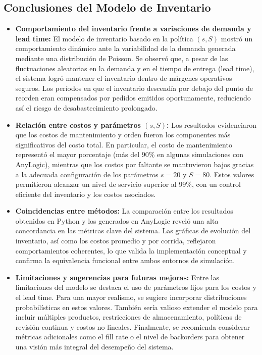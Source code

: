 \documentclass[12pt]{article}
\begin{document}
\subsection{Conclusiones del Modelo de Inventario}
\begin{itemize}
    \item \textbf{Comportamiento del inventario frente a variaciones de demanda y lead time:}  
    El modelo de inventario basado en la política $(s, S)$ mostró un comportamiento dinámico ante la variabilidad de la demanda generada mediante una distribución de Poisson. Se observó que, a pesar de las fluctuaciones aleatorias en la demanda y en el tiempo de entrega (lead time), el sistema logró mantener el inventario dentro de márgenes operativos seguros. Los períodos en que el inventario descendía por debajo del punto de reorden eran compensados por pedidos emitidos oportunamente, reduciendo así el riesgo de desabastecimiento prolongado.

    \item \textbf{Relación entre costos y parámetros $(s, S)$:}  
    Los resultados evidenciaron que los costos de mantenimiento y orden fueron los componentes más significativos del costo total. En particular, el costo de mantenimiento representó el mayor porcentaje (más del 90\% en algunas simulaciones con AnyLogic), mientras que los costos por faltante se mantuvieron bajos gracias a la adecuada configuración de los parámetros $s = 20$ y $S = 80$. Estos valores permitieron alcanzar un nivel de servicio superior al 99\%, con un control eficiente del inventario y los costos asociados.

    \item \textbf{Coincidencias entre métodos:}  
    La comparación entre los resultados obtenidos en Python y los generados en AnyLogic reveló una alta concordancia en las métricas clave del sistema. Las gráficas de evolución del inventario, así como los costos promedio y por corrida, reflejaron comportamientos coherentes, lo que valida la implementación conceptual y confirma la equivalencia funcional entre ambos entornos de simulación.

    \item \textbf{Limitaciones y sugerencias para futuras mejoras:}  
    Entre las limitaciones del modelo se destaca el uso de parámetros fijos para los costos y el lead time. Para una mayor realismo, se sugiere incorporar distribuciones probabilísticas en estos valores. También sería valioso extender el modelo para incluir múltiples productos, restricciones de almacenamiento, políticas de revisión continua y costos no lineales. Finalmente, se recomienda considerar métricas adicionales como el fill rate o el nivel de backorders para obtener una visión más integral del desempeño del sistema.
\end{itemize}
\end{document}
